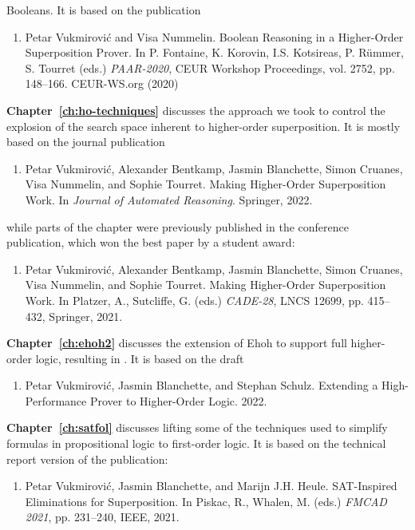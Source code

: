 Booleans. It is based on the publication
    \begin{enumerate}[resume]
      \item Petar Vukmirović and Visa Nummelin. Boolean Reasoning in a Higher-Order
      Superposition Prover. In P. Fontaine, K. Korovin, I.S. Kotsireas, P.
      R\"ummer, S. Tourret (eds.) \emph{PAAR-2020}, CEUR Workshop Proceedings, vol.
      2752, pp. 148--166. CEUR-WS.org (2020)
    \end{enumerate}
\noindent\textbf{Chapter~\ref{ch:ho-techniques}} discusses the approach we took to
control the explosion of the search space inherent to higher-order superposition. It is mostly based on the journal publication
  \begin{enumerate}[resume]
    \item Petar Vukmirović, Alexander Bentkamp, Jasmin Blanchette, Simon Cruanes, Visa Nummelin, and Sophie Tourret.
    Making Higher-Order Superposition Work. In \emph{Journal of Automated Reasoning}. Springer, 2022.
  \end{enumerate}
\vspace{-0.3em}
  while parts of the chapter were previously published in the conference publication, which won the best paper by a student award:
\vspace{-0.3em}
\begin{enumerate}[resume]
  \item Petar Vukmirović, Alexander Bentkamp, Jasmin Blanchette, Simon Cruanes, Visa Nummelin, and Sophie Tourret.
  Making Higher-Order Superposition Work. In Platzer, A., Sutcliffe, G. (eds.) \emph{CADE-28},
  LNCS 12699, pp. 415--432, Springer, 2021.
\end{enumerate}
\noindent\textbf{Chapter~\ref{ch:ehoh2}} discusses the extension of Ehoh to
support full higher-order logic, resulting in \newehoh.
It is based on the draft 
\begin{enumerate}[resume]
  \item Petar Vukmirović, Jasmin Blanchette, and Stephan Schulz.  Extending a
  High-Per\-for\-mance Prover to Higher-Order Logic. 2022.
\end{enumerate}

\noindent\textbf{Chapter~\ref{ch:satfol}} discusses lifting some of the techniques used to
simplify formulas in propositional logic to first-order logic. It is based on the technical report version of the publication:
  \begin{enumerate}[resume]
    \item Petar Vukmirović, Jasmin Blanchette, and Marijn J.H. Heule. 
    SAT-Inspired Eliminations for Superposition. In Piskac, R., Whalen, M. (eds.) \emph{FMCAD 2021}, pp. 231--240, IEEE, 2021. 
  \end{enumerate}

